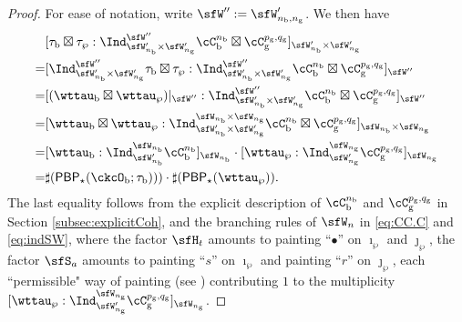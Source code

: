 \documentclass[12pt,a4paper]{amsart}
\numberwithin{equation}{section}
\theoremstyle{remark}
\def\nbb{n_{\mathrm b}}
\def\PBP{\mathsf{PBP}}
\begin{document}
\begin{proof}
  For ease of notation, write $\sfW'':=\sfW_{n_{\mathrm b},n_{\mathrm g}}'$. We then have
  \[
    \begin{split}
      & [\tau_{\mathrm b}\boxtimes \tau_{\wp} :
      \Ind_{\sfW'_{n_{\mathrm b}}\times \sfW'_{n_{\mathrm g}}}^{\sfW''} \cC_{\mathrm b}^{\nbb} \boxtimes \cC_{\mathrm g}^{p_{\mathrm g},q_{\mathrm g}}]_{\sfW'_{n_{\mathrm b}}\times \sfW'_{n_{\mathrm g}}}\\
      = & [\Ind_{\sfW'_{n_{\mathrm b}}\times \sfW'_{n_{\mathrm g}}}^{\sfW''} \tau_{\mathrm b}\boxtimes \tau_{\wp} :
      \Ind_{\sfW'_{n_{\mathrm b}}\times \sfW'_{n_{\mathrm g}}}^{\sfW''} \cC_{\mathrm b}^{\nbb} \boxtimes \cC_{\mathrm g}^{p_{\mathrm g},q_{\mathrm g}}]_{\sfW''}\\
      = & [(\wttau_{\mathrm b}\boxtimes \wttau_{\wp})|_{\sfW''}:
      \Ind_{\sfW'_{n_{\mathrm b}}\times \sfW'_{n_{\mathrm g}}}^{\sfW''} \cC_{\mathrm b}^{\nbb} \boxtimes \cC_{\mathrm g}^{p_{\mathrm g},q_{\mathrm g}}]_{\sfW''}\\
      = & [\wttau_{\mathrm b}\boxtimes \wttau_{\wp}:
      \Ind_{\sfW'_{n_{\mathrm b}}\times \sfW'_{n_{\mathrm g}}}^{\sfW_{n_{\mathrm b}}\times \sfW_{n_{\mathrm g}}} \cC_{\mathrm b}^{\nbb} \boxtimes \cC_{\mathrm g}^{p_{\mathrm g},q_{\mathrm g}}]_{\sfW_{n_{\mathrm b}}\times \sfW_{n_{\mathrm g}}}\\
       = & [\wttau_{\mathrm b}:\Ind_{\sfW'_{n_{\mathrm b}}}^{\sfW_{n_{\mathrm b}}} \cC_{\mathrm b}^{\nbb}]_{\sfW_{n_{\mathrm b}}}\cdot
           [\wttau_{\wp}:\Ind_{\sfW'_{n_{\mathrm g}}}^{\sfW_{n_{\mathrm g}}} \cC_{\mathrm g}^{p_{\mathrm g},q_{\mathrm g}}]_{\sfW_{n_{\mathrm g}}}\\
      =& \sharp(\PBP_{\star}(\ckcO_{\mathrm b}; \tau _{\mathrm b})))\cdot \sharp(\PBP_{\star}(\wttau_{\wp})).
    \end{split}
  \]
  The last equality follows from the explicit description of $\cC_{\mathrm b}^{\nbb}$ and $\cC_{\mathrm g}^{p_{\mathrm g},q_{\mathrm g}}$ in Section \ref{subsec:explicitCoh}, and
  the branching rules of $\sfW_{n}$ in \eqref{eq:CC.C} and \eqref{eq:indSW}, where the factor $\sfH_{t}$ amounts to painting ``$\bullet$'' on $\imath_{\wp}$ and $\jmath_{\wp}$, the factor $\sfS_{a}$ amounts to painting ``$s$'' on $\imath_{\wp}$ and painting ``$r$'' on $\jmath_{\wp}$, each ``permissible" way of painting (see )
  contributing $1$ to the multiplicity $[\wttau_{\wp}:\Ind_{\sfW'_{n_{\mathrm g}}}^{\sfW_{n_{\mathrm g}}} \cC_{\mathrm g}^{p_{\mathrm g},q_{\mathrm g}}]_{\sfW_{n_{\mathrm g}}}$.
\end{proof}
\end{document}

